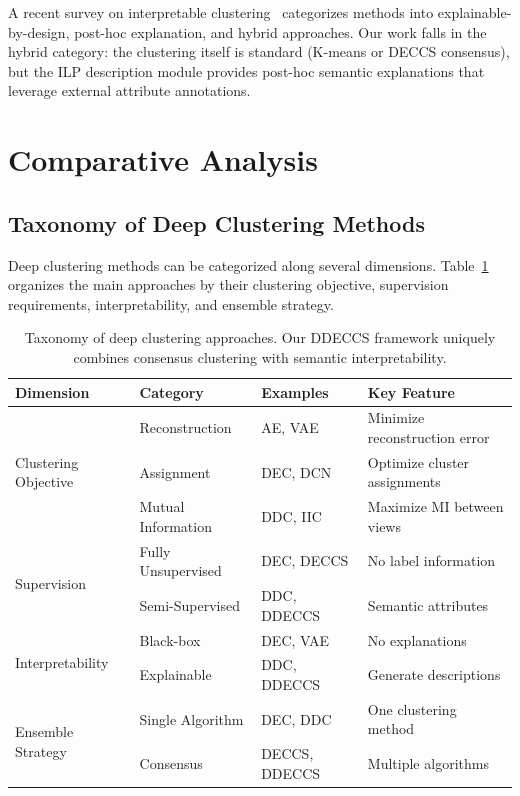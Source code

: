 A recent survey on interpretable clustering~\citep{InterpClustering2024} categorizes methods into explainable-by-design, post-hoc explanation, and hybrid approaches. Our work falls in the hybrid category: the clustering itself is standard (K-means or DECCS consensus), but the ILP description module provides post-hoc semantic explanations that leverage external attribute annotations.

\section{Comparative Analysis}

\subsection{Taxonomy of Deep Clustering Methods}

Deep clustering methods can be categorized along several dimensions. Table~\ref{tab:taxonomy} organizes the main approaches by their clustering objective, supervision requirements, interpretability, and ensemble strategy.

\begin{table}[H]
    \centering
    \caption{Taxonomy of deep clustering approaches. Our DDECCS framework uniquely combines consensus clustering with semantic interpretability.}
    \label{tab:taxonomy}
    \small
    \begin{tabular}{p{3cm}p{3cm}p{3cm}p{3cm}}
        \hline
        \textbf{Dimension} & \textbf{Category} & \textbf{Examples} & \textbf{Key Feature} \\
        \hline
        \multirow{3}{3cm}{Clustering Objective}
        & Reconstruction & AE, VAE & Minimize reconstruction error \\
        & Assignment & DEC, DCN & Optimize cluster assignments \\
        & Mutual Information & DDC, IIC & Maximize MI between views \\
        \hline
        \multirow{2}{3cm}{Supervision}
        & Fully Unsupervised & DEC, DECCS & No label information \\
        & Semi-Supervised & DDC, DDECCS & Semantic attributes \\
        \hline
        \multirow{2}{3cm}{Interpretability}
        & Black-box & DEC, VAE & No explanations \\
        & Explainable & DDC, DDECCS & Generate descriptions \\
        \hline
        \multirow{2}{3cm}{Ensemble Strategy}
        & Single Algorithm & DEC, DDC & One clustering method \\
        & Consensus & DECCS, DDECCS & Multiple algorithms \\
        \hline
    \end{tabular}
\end{table}


